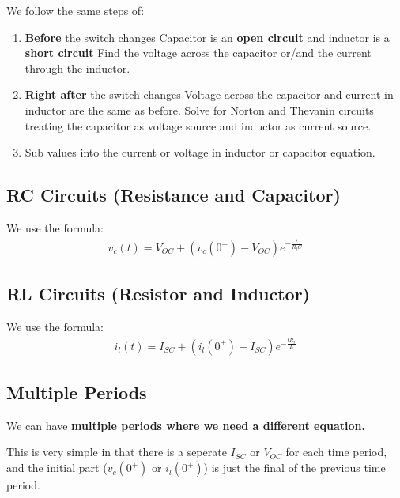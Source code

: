 \documentclass[12pt,letterpaper]{article} \usepackage{amsmath} \usepackage{graphicx} \usepackage[margin=1in]{geometry} \usepackage{longtable}  \usepackage{amssymb}
\begin{document}
	We follow the same steps of: 
	\begin{enumerate}[noitemsep]
		\item \textbf{Before} the switch changes
		\subitem Capacitor is an \textbf{open circuit }and inductor is a \textbf{short circuit}
		\subitem Find the voltage across the capacitor or/and the current through the inductor.
		\item \textbf{Right after} the switch changes
		\subitem Voltage across the capacitor and current in inductor are the same as before.
		\subitem Solve for Norton and Thevanin circuits treating the capacitor as voltage source and inductor as current source.
		\item Sub values into the current or voltage in inductor or capacitor equation.
	\end{enumerate}
	
	\subsection{RC Circuits (Resistance and Capacitor)}
	We use the formula:
	\begin{align*}
		v_c(t)=V_{OC}+(v_c(0^+)-V_{OC})e^{-\frac{t}{R_tC}}
	\end{align*}
	
	\subsection{RL Circuits (Resistor and Inductor)}
	We use the formula:
	\begin{align*}
		i_l(t)=I_{SC}+(i_l(0^+)-I_{SC})e^{-\frac{tR_t}{L}}
	\end{align*}

	\subsection{Multiple Periods}
	We can have \textbf{multiple periods where we need a different equation.}
	
	This is very simple in that there is a seperate $I_{SC}$ or $V_{OC}$ for each time period, and the initial part ($v_c(0^+)$ or $i_l(0^+)$) is just the final of the previous time period. 
	
\end{document}
